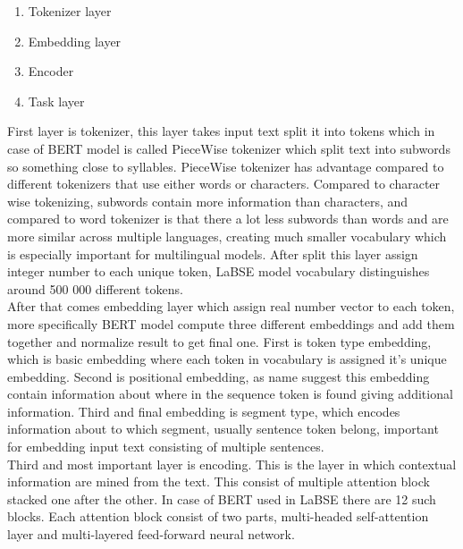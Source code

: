 \begin{enumerate}
	\item Tokenizer layer
	\item Embedding layer
	\item Encoder
	\item Task layer
\end{enumerate}

First layer is tokenizer, this layer takes input text split it into tokens which in case of BERT model is called PieceWise tokenizer which split text into subwords so something close to syllables. PieceWise tokenizer has advantage compared to different tokenizers that use either words or characters. Compared to character wise tokenizing, subwords contain more information than characters, and compared to word tokenizer is that there a lot less subwords than words and are more similar across multiple languages, creating much smaller vocabulary which is especially important for multilingual models. After split this layer assign integer number to each unique token, LaBSE model vocabulary distinguishes around 500 000 different tokens.
\\

After that comes embedding layer which assign real number vector to each token, more specifically BERT model compute three different embeddings and add them together and normalize result to get final one. First is token type embedding, which is basic embedding where each token in vocabulary is assigned it's unique embedding. Second is positional embedding, as name suggest this embedding contain information about where in the sequence token is found giving additional information. Third and final embedding is segment type, which encodes information about to which segment, usually sentence token belong, important for embedding input text consisting of multiple sentences.
\\

Third and most important layer is encoding. This is the layer in which contextual information are mined from the text. This consist of multiple attention block stacked one after the other. In case of BERT used in LaBSE there are 12 such blocks. Each attention block consist of two parts, multi-headed self-attention layer and multi-layered feed-forward neural network. 
\\


